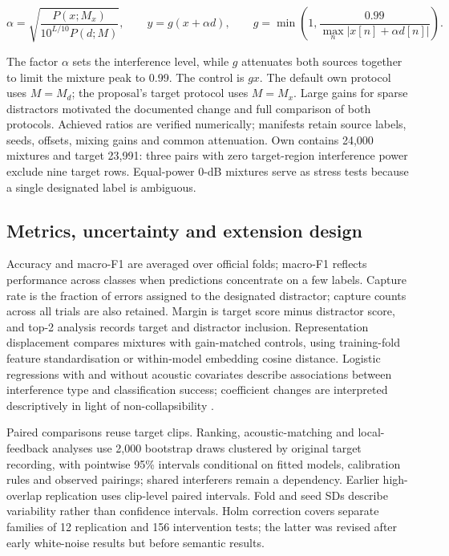 \documentclass[a4paper,10pt]{article}
\begin{document}
\[
\alpha=\sqrt{\frac{P(x;M_x)}{10^{L/10}P(d;M)}},\qquad y=g(x+\alpha d),\qquad g=\min\left(1,\frac{0.99}{\max_n|x[n]+\alpha d[n]|}\right).
\]

The factor $\alpha$ sets the interference level, while $g$ attenuates both sources together to limit the mixture peak to 0.99. The control is $gx$. The default own protocol uses $M=M_d$; the proposal's target protocol uses $M=M_x$. Large gains for sparse distractors motivated the documented change and full comparison of both protocols. Achieved ratios are verified numerically; manifests retain source labels, seeds, offsets, mixing gains and common attenuation. Own contains 24,000 mixtures and target 23,991: three pairs with zero target-region interference power exclude nine target rows. Equal-power 0-dB mixtures serve as stress tests because a single designated label is ambiguous.

\subsection{Metrics, uncertainty and extension design}\label{sec:metrics}

Accuracy and macro-F1 are averaged over official folds; macro-F1 reflects performance across classes when predictions concentrate on a few labels. Capture rate is the fraction of errors assigned to the designated distractor; capture counts across all trials are also retained. Margin is target score minus distractor score, and top-2 analysis records target and distractor inclusion. Representation displacement compares mixtures with gain-matched controls, using training-fold feature standardisation or within-model embedding cosine distance. Logistic regressions with and without acoustic covariates describe associations between interference type and classification success; coefficient changes are interpreted descriptively in light of non-collapsibility \cite{noncollapsibility}.

Paired comparisons reuse target clips. Ranking, acoustic-matching and local-feedback analyses use 2,000 bootstrap draws clustered by original target recording, with pointwise 95\% intervals conditional on fitted models, calibration rules and observed pairings; shared interferers remain a dependency. Earlier high-overlap replication uses clip-level paired intervals. Fold and seed SDs describe variability rather than confidence intervals. Holm correction covers separate families of 12 replication and 156 intervention tests; the latter was revised after early white-noise results but before semantic results.
\end{document}
